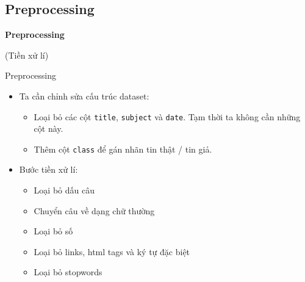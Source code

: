\documentclass[aspectratio=169,xcolor=dvipsnames]{beamer}
\begin{document}
\subsection{Preprocessing}

\begin{frame}
	\Huge{\centerline{\textbf{Preprocessing}}}
	\centerline{(Tiền xử lí)}
\end{frame}

\begin{frame}{Preprocessing}
\begin{itemize}
\item Ta cần chỉnh sửa cấu trúc dataset:
\begin{itemize}
\item Loại bỏ các cột \texttt{title}, \texttt{subject} và \texttt{date}. Tạm thời ta không cần những cột này.
\item Thêm cột \texttt{class} để gán nhãn tin thật / tin giả.
\end{itemize}
\item Bước tiền xử lí:
\begin{itemize}
\item Loại bỏ dấu câu
\item Chuyển câu về dạng chữ thường
\item Loại bỏ số
\item Loại bỏ links, html tags và ký tự đặc biệt
\item Loại bỏ stopwords
\end{itemize}
\end{itemize}
\end{frame}
\end{document}
